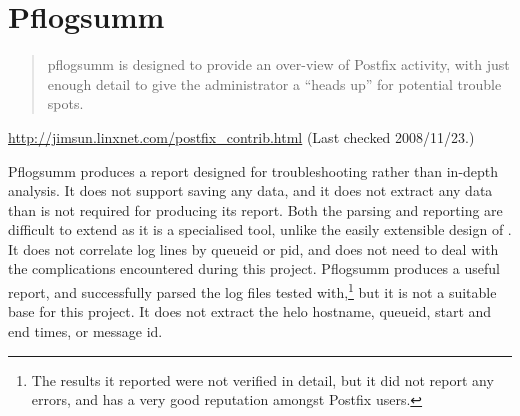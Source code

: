 %

\section{Pflogsumm}

\begin{quotation}

    pflogsumm is designed to provide an over-view of Postfix activity, with
    just enough detail to give the administrator a ``heads up'' for
    potential trouble spots.

\end{quotation}

\noindent{}\url{http://jimsun.linxnet.com/postfix_contrib.html} \newline{}
(Last checked 2008/11/23.)

Pflogsumm produces a report designed for troubleshooting rather than
in-depth analysis.  It does not support saving any data, and it does not
extract any data than is not required for producing its report.  Both the
parsing and reporting are difficult to extend as it is a specialised tool,
unlike the easily extensible design of \parsername{}.  It does not
correlate log lines by queueid or \gls{pid}, and does not need to deal with
the complications encountered during this project.  Pflogsumm produces a
useful report, and successfully parsed the \numberOFlogFILES{} log files
tested with,\footnote{The results it reported were not verified in detail,
but it did not report any errors, and has a very good reputation amongst
Postfix users.} but it is not a suitable base for this project.  It does
not extract the helo hostname, queueid, start and end times, or message id.

